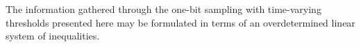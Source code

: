 \documentclass[12pt,draftcls,onecolumn]{IEEEtran}
\begin{document}

The information gathered through the one-bit sampling with time-varying thresholds presented here may be formulated in terms of an overdetermined linear system of inequalities. 

\end{document}
